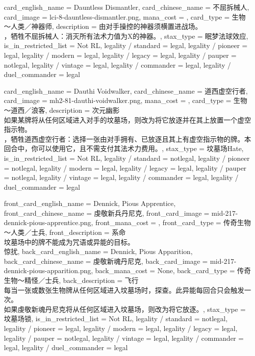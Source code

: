 \documentclass[lang = cn, color = black, 10pt]{AllThatStax}
\begin{document}
\card
{
	card_english_name = {Dauntless Dismantler},
	card_chinese_name = {不屈拆械人},
	card_image = lci-8-dauntless-dismantler.png,
	mana_cost = ,
	card_type = 生物～人类／神器师,
	description = {由对手操控的神器须横置进战场。\\
，牺牲不屈拆械人：消灭所有法术力值为X的神器。},
	stax_type = 眠梦法球效应,
	is_in_restricted_list = Not RL,
	legality / standard = legal,
	legality / pioneer = legal,
	legality / modern = legal,
	legality / legacy = legal,
	legality / pauper = notlegal,
	legality / vintage = legal,
	legality / commander = legal,
	legality / duel_commander = legal
}

\card
{
	card_english_name = {Dauthi Voidwalker},
	card_chinese_name = {道西虚空行者},
	card_image = mh2-81-dauthi-voidwalker.png,
	mana_cost = ,
	card_type = 生物～道西／浪客,
	description = {次元幽影\\
如果某牌将从任何区域进入对手的坟墓场，则改为将它放逐并在其上放置一个虚空指示物。\\
，牺牲道西虚空行者：选择一张由对手拥有、已放逐且其上有虚空指示物的牌。本回合中，你可以使用它，且不需支付其法术力费用。},
	stax_type = 坟墓场Hate,
	is_in_restricted_list = Not RL,
	legality / standard = notlegal,
	legality / pioneer = notlegal,
	legality / modern = legal,
	legality / legacy = legal,
	legality / pauper = notlegal,
	legality / vintage = legal,
	legality / commander = legal,
	legality / duel_commander = legal
}

\mfcard
{
	front_card_english_name = {Dennick, Pious Apprentice},
	front_card_chinese_name = {虔敬新兵丹尼克},
	front_card_image = mid-217-dennick-pious-apprentice.png,
	front_mana_cost = ,
	front_card_type = 传奇生物～人类／士兵,
	front_description = {系命\\
坟墓场中的牌不能成为咒语或异能的目标。\\
惊扰},
	back_card_english_name = {Dennick, Pious Apparition},
	back_card_chinese_name = {虔敬新魂丹尼克},
	back_card_image = mid-217-dennick-pious-apparition.png,
	back_mana_cost = None,
	back_card_type = 传奇生物～精怪／士兵,
	back_description = {飞行\\
每当一张或数张生物牌从任何区域进入坟墓场时，探查。此异能每回合只会触发一次。\\
如果虔敬新魂丹尼克将从任何区域进入坟墓场，则改为将它放逐。},
	stax_type = 坟墓场锁,
	is_in_restricted_list = Not RL,
	legality / standard = notlegal,
	legality / pioneer = legal,
	legality / modern = legal,
	legality / legacy = legal,
	legality / pauper = notlegal,
	legality / vintage = legal,
	legality / commander = legal,
	legality / duel_commander = legal
}
\end{document}
